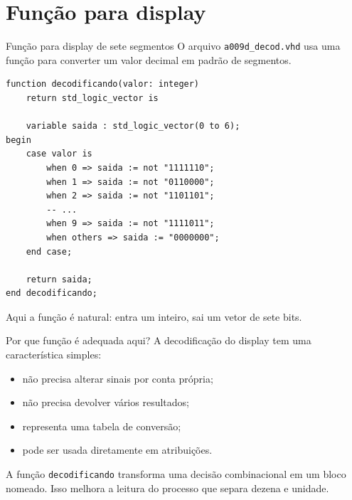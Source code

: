 \documentclass[aspectratio=169,11pt]{beamer}
\begin{document}
\section{Função para display}

\begin{frame}[fragile]{Função para display de sete segmentos}
    O arquivo \texttt{a009d\_decod.vhd} usa uma função para converter um valor decimal em padrão de segmentos.

\begin{lstlisting}
function decodificando(valor: integer)
    return std_logic_vector is

    variable saida : std_logic_vector(0 to 6);
begin
    case valor is
        when 0 => saida := not "1111110";
        when 1 => saida := not "0110000";
        when 2 => saida := not "1101101";
        -- ...
        when 9 => saida := not "1111011";
        when others => saida := "0000000";
    end case;

    return saida;
end decodificando;
\end{lstlisting}

    \vspace{0.3em}
    Aqui a função é natural: entra um inteiro, sai um vetor de sete bits.
\end{frame}

\begin{frame}{Por que função é adequada aqui?}
    A decodificação do display tem uma característica simples:
    \begin{itemize}
        \item não precisa alterar sinais por conta própria;
        \item não precisa devolver vários resultados;
        \item representa uma tabela de conversão;
        \item pode ser usada diretamente em atribuições.
    \end{itemize}

    \vspace{0.5em}
    A função \texttt{decodificando} transforma uma decisão combinacional em um bloco nomeado. Isso melhora a leitura do processo que separa dezena e unidade.
\end{frame}
\end{document}
